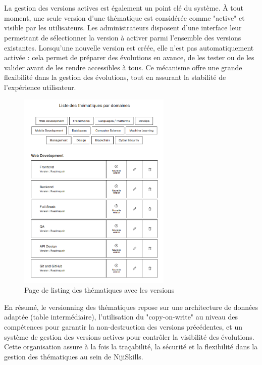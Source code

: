 \documentclass[12pt]{article}
\begin{document}
\\\\
La gestion des versions actives est également un point clé du système. À tout moment, une seule version d’une thématique est considérée comme "active" et visible par les utilisateurs. Les administrateurs disposent d’une interface leur permettant de sélectionner la version à activer parmi l’ensemble des versions existantes. Lorsqu’une nouvelle version est créée, elle n’est pas automatiquement activée : cela permet de préparer des évolutions en avance, de les tester ou de les valider avant de les rendre accessibles à tous. Ce mécanisme offre une grande flexibilité dans la gestion des évolutions, tout en assurant la stabilité de l’expérience utilisateur.
\begin{figure}[H]
    \centering
    \includegraphics[width=0.65\textwidth]{img/listing-version.png} 
    \caption{Page de listing des thématiques avec les versions}
\end{figure}
En résumé, le versionning des thématiques repose sur une architecture de données adaptée (table intermédiaire), l’utilisation du "copy-on-write" au niveau des compétences pour garantir la non-destruction des versions précédentes, et un système de gestion des versions actives pour contrôler la visibilité des évolutions. Cette organisation assure à la fois la traçabilité, la sécurité et la flexibilité dans la gestion des thématiques au sein de NijiSkills.
\end{document}
